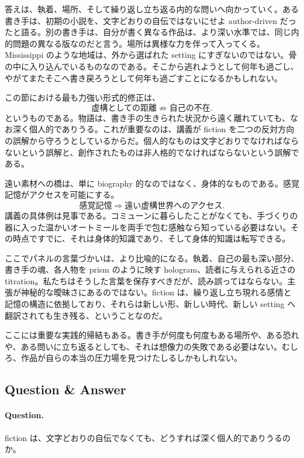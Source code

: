 答えは、執着、場所、そして繰り返し立ち返る内的な問いへ向かっていく。ある書き手は、初期の小説を、文字どおりの自伝ではないにせよ author-driven だったと語る。別の書き手は、自分が書く異なる作品は、より深い水準では、同じ内的問題の異なる版なのだと言う。場所は異様な力を伴って入ってくる。Mississippi のような地域は、外から選ばれた setting にすぎないのではない。骨の中に入り込んでいるものなのである。そこから逃れようとして何年も過ごし、やがてまたそこへ書き戻ろうとして何年も過ごすことになるかもしれない。

この節における最も力強い形式的修正は、
\begin{equation}
\text{虚構としての距離} \not\Rightarrow \text{自己の不在}.
\end{equation}
というものである。物語は、書き手の生きられた状況から遠く離れていても、なお深く個人的でありうる。これが重要なのは、講義が fiction を二つの反対方向の誤解から守ろうとしているからだ。個人的なものは文字どおりでなければならないという誤解と、創作されたものは非人格的でなければならないという誤解である。

遠い素材への橋は、単に biography 的なのではなく、身体的なものである。感覚記憶がアクセスを可能にする。
\begin{equation}
\text{感覚記憶} \Rightarrow \text{遠い虚構世界へのアクセス}.
\end{equation}
講義の具体例は見事である。コミューンに暮らしたことがなくても、手づくりの器に入った温かいオートミールを両手で包む感触なら知っている必要はない。その時点ですでに、それは身体的知識であり、そして身体的知識は転写できる。

ここでパネルの言葉づかいは、より比喩的になる。執着、自己の最も深い部分、書き手の魂、各人物を prism のように映す hologram、読者に与えられる近さの titration。私たちはそうした言葉を保存すべきだが、読み誤ってはならない。主張が神秘的な曖昧さにあるのではない。fiction は、繰り返し立ち現れる感情と記憶の構造に依拠しており、それらは新しい形、新しい時代、新しい setting へ翻訳されても生き残る、ということなのだ。

ここには重要な実践的帰結もある。書き手が何度も何度もある場所や、ある恐れや、ある問いに立ち返るとしても、それは想像力の失敗である必要はない。むしろ、作品が自らの本当の圧力場を見つけたしるしかもしれない。

\subsection{Question \& Answer}

\paragraph{Question.} fiction は、文字どおりの自伝でなくても、どうすれば深く個人的でありうるのか。

